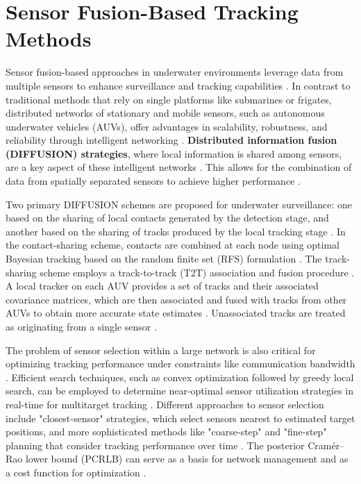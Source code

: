\section{Sensor Fusion-Based Tracking Methods}
Sensor fusion-based approaches in underwater environments leverage data from multiple sensors to enhance surveillance and tracking capabilities \cite{braca2015distributed, tharmarasa2007large, uney2022passive}. In contrast to traditional methods that rely on single platforms like submarines or frigates, distributed networks of stationary and mobile sensors, such as autonomous underwater vehicles (AUVs), offer advantages in scalability, robustness, and reliability through intelligent networking \cite{braca2015distributed}. \textbf{Distributed information fusion (DIFFUSION) strategies}, where local information is shared among sensors, are a key aspect of these intelligent networks \cite{braca2015distributed}. This allows for the combination of data from spatially separated sensors to achieve higher performance \cite{braca2015distributed}.

Two primary DIFFUSION schemes are proposed for underwater surveillance: one based on the sharing of local contacts generated by the detection stage, and another based on the sharing of tracks produced by the local tracking stage \cite{braca2015distributed}. In the contact-sharing scheme, contacts are combined at each node using optimal Bayesian tracking based on the random finite set (RFS) formulation \cite{braca2015distributed}. The track-sharing scheme employs a track-to-track (T2T) association and fusion procedure \cite{braca2015distributed}. A local tracker on each AUV provides a set of tracks and their associated covariance matrices, which are then associated and fused with tracks from other AUVs to obtain more accurate state estimates \cite{braca2015distributed}. Unassociated tracks are treated as originating from a single sensor \cite{braca2015distributed}.

The problem of sensor selection within a large network is also critical for optimizing tracking performance under constraints like communication bandwidth \cite{tharmarasa2007large}. Efficient search techniques, such as convex optimization followed by greedy local search, can be employed to determine near-optimal sensor utilization strategies in real-time for multitarget tracking \cite{tharmarasa2007large}. Different approaches to sensor selection include "closest-sensor" strategies, which select sensors nearest to estimated target positions, and more sophisticated methods like "coarse-step" and "fine-step" planning that consider tracking performance over time \cite{tharmarasa2007large}. The posterior Cramér–Rao lower bound (PCRLB) can serve as a basis for network management and as a cost function for optimization \cite{tharmarasa2007large}.

